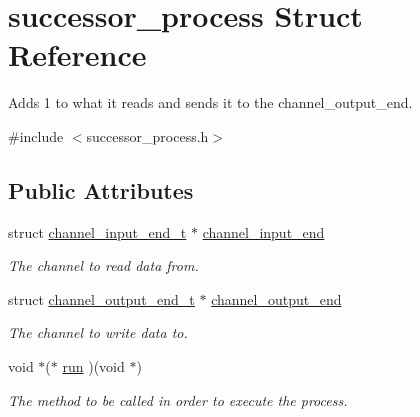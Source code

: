 \hypertarget{structsuccessor__process}{\section{successor\-\_\-process Struct Reference}
\label{structsuccessor__process}
}


Adds 1 to what it reads and sends it to the channel\-\_\-output\-\_\-end.  




{\ttfamily \#include $<$successor\-\_\-process.\-h$>$}

\subsection*{Public Attributes}
\begin{DoxyCompactItemize}
\item 
\hypertarget{structsuccessor__process_ae39274eb5847039d05508e3eb2ce7112}{struct \hyperlink{structchannel__input__end__t}{channel\-\_\-input\-\_\-end\-\_\-t} $\ast$ \hyperlink{structsuccessor__process_ae39274eb5847039d05508e3eb2ce7112}{channel\-\_\-input\-\_\-end}}\label{structsuccessor__process_ae39274eb5847039d05508e3eb2ce7112}

\begin{DoxyCompactList}\small\item\em The channel to read data from. \end{DoxyCompactList}\item 
\hypertarget{structsuccessor__process_abed6bc493bf621182af21d997f7c2576}{struct \hyperlink{structchannel__output__end__t}{channel\-\_\-output\-\_\-end\-\_\-t} $\ast$ \hyperlink{structsuccessor__process_abed6bc493bf621182af21d997f7c2576}{channel\-\_\-output\-\_\-end}}\label{structsuccessor__process_abed6bc493bf621182af21d997f7c2576}

\begin{DoxyCompactList}\small\item\em The channel to write data to. \end{DoxyCompactList}\item 
\hypertarget{structsuccessor__process_ad8548f8ca92287d89e425b4d7904df24}{void $\ast$($\ast$ \hyperlink{structsuccessor__process_ad8548f8ca92287d89e425b4d7904df24}{run} )(void $\ast$)}\label{structsuccessor__process_ad8548f8ca92287d89e425b4d7904df24}

\begin{DoxyCompactList}\small\item\em The method to be called in order to execute the process. \end{DoxyCompactList}\end{DoxyCompactItemize}


